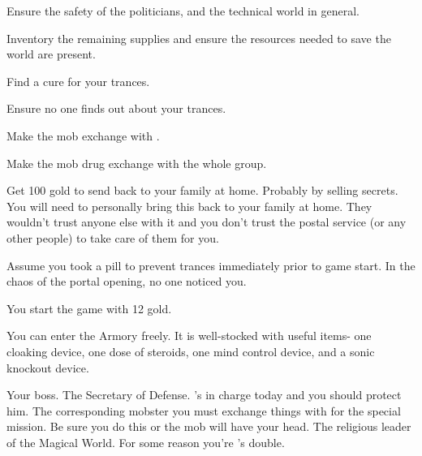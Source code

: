 \documentclass[char]{guildcamp3}
\begin{document}

\begin{itemz}[Goals]
  \item Ensure the safety of the politicians, and the technical world in general.
  \item Inventory the remaining supplies and ensure the resources needed to save the world are present.
  \item Find a cure for your trances.
  \item Ensure no one finds out about your trances.
  \item Make the mob exchange with \cServant{\informal}.
  \item Make the mob drug exchange with the whole group.
  \item Get 100 gold to send back to your family at home. Probably by selling secrets. You will need to personally bring this back to your family at home. They wouldn't trust anyone else with it and you don't trust the postal service (or any other people) to take care of them for you. 
\end{itemz}

\begin{itemz}[Notes]
  \item Assume you took a pill to prevent trances immediately prior to game start. In the chaos of the portal opening, no one noticed you. 
  \item You start the game with 12 gold. 
  \item You can enter the Armory freely. It is well-stocked with useful items- one cloaking device, one dose of steroids, one mind control device, and a sonic knockout device.

\end{itemz}


\begin{contacts}
  \contact{\cSpecOpOne{}} Your boss.
  \contact{\cPoliOne{}} The Secretary of Defense. 's in charge today and you should protect him.
  \contact{\cServant{}} The corresponding mobster you must exchange things with for the special mission. Be sure you do this or the mob will have your head.
  \contact{\cPaladin{}} The religious leader of the Magical World. For some reason you're \cPaladin{}'s double. 
\end{contacts}
\end{document}
